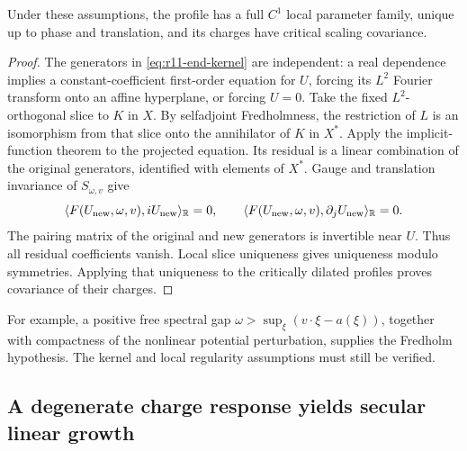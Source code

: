 \begin{lemma}
\label{lem:r11-end-slice}
Under these assumptions, the profile has a full $C^1$ local parameter
family, unique up to phase and translation, and its charges have critical
scaling covariance.
\end{lemma}
\begin{proof}
The generators in \eqref{eq:r11-end-kernel} are independent: a real
dependence implies a constant-coefficient first-order equation for $U$,
forcing its $L^2$ Fourier transform onto an affine hyperplane, or forcing
$U=0$.  Take the fixed $L^2$-orthogonal slice to $K$ in $X$.  By
selfadjoint Fredholmness, the restriction of $L$ is an isomorphism from
that slice onto the annihilator of $K$ in $X^*$.  Apply the implicit-function
theorem to the projected equation.  Its residual is a linear combination
of the original generators, identified with elements of $X^*$.
Gauge and translation invariance of $S_{\omega,v}$ give
\[
 \langle F(U_{\rm new},\omega,v),iU_{\rm new}\rangle_{\mathbb R}=0,
 \qquad
 \langle F(U_{\rm new},\omega,v),\partial_jU_{\rm new}\rangle_{\mathbb R}=0.
\]
The pairing matrix of the original and new generators is invertible near
$U$.  Thus all residual coefficients vanish.  Local slice uniqueness
gives uniqueness modulo symmetries.  Applying that uniqueness to the
critically dilated profiles proves covariance of their charges.
\end{proof}

For example, a positive free spectral gap
$\omega>\sup_\xi(v\cdot\xi-a(\xi))$, together with compactness of the
nonlinear potential perturbation, supplies the Fredholm hypothesis.
The kernel and local regularity assumptions must still be verified.

\subsection{A degenerate charge response yields secular linear growth}

